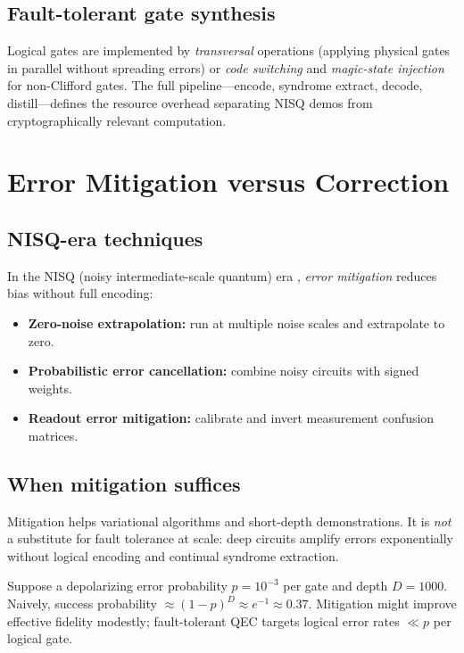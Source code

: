 \subsection{Fault-tolerant gate synthesis}

Logical gates are implemented by \emph{transversal} operations (applying physical gates in parallel without spreading errors) or \emph{code switching} and \emph{magic-state injection} for non-Clifford gates. The full pipeline---encode, syndrome extract, decode, distill---defines the resource overhead separating NISQ demos from cryptographically relevant computation.

\section{Error Mitigation versus Correction}
\label{sec:mitigation}

\subsection{NISQ-era techniques}

In the NISQ (noisy intermediate-scale quantum) era \cite{preskill2018}, \emph{error mitigation} reduces bias without full encoding:
\begin{itemize}[noitemsep]
\item \textbf{Zero-noise extrapolation:} run at multiple noise scales and extrapolate to zero.
\item \textbf{Probabilistic error cancellation:} combine noisy circuits with signed weights.
\item \textbf{Readout error mitigation:} calibrate and invert measurement confusion matrices.
\end{itemize}

\subsection{When mitigation suffices}

Mitigation helps variational algorithms and short-depth demonstrations. It is \emph{not} a substitute for fault tolerance at scale: deep circuits amplify errors exponentially without logical encoding and continual syndrome extraction.

\begin{example}
Suppose a depolarizing error probability $p=10^{-3}$ per gate and depth $D=1000$. Naively, success probability $\approx (1-p)^D\approx e^{-1}\approx 0.37$. Mitigation might improve effective fidelity modestly; fault-tolerant QEC targets logical error rates $\ll p$ per logical gate.
\end{example}

